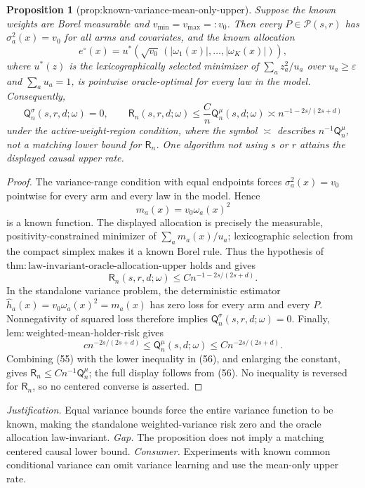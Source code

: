\documentclass{article}
\newtheorem{proposition}{Proposition}
\begin{document}
\begin{proposition}[prop:known-variance-mean-only-upper]\label{prop:known-variance-mean-only-upper}
Suppose the known weights are Borel measurable and \(v_{\min}=v_{\max}=:v_0\). Then every \(P\in\mathcal P(s,r)\) has \(\sigma_a^2(x)=v_0\) for all arms and covariates, and the known allocation
\[
e^{\circ}(x)
=u^*\!\left(\sqrt{v_0}\,(|\omega_1(x)|,\ldots,|\omega_K(x)|)\right),
\]
where \(u^*(z)\) is the lexicographically selected minimizer of \(\sum_a z_a^2/u_a\) over \(u_a\geq\varepsilon\) and \(\sum_a u_a=1\), is pointwise oracle-optimal for every law in the model. Consequently,
\[
\mathsf Q_n^{\sigma}(s,r,d;\omega)=0,
\qquad
\mathsf R_n(s,r,d;\omega)
\leq \frac{C}{n}\mathsf Q_n^{\mu}(s,d;\omega)
\asymp n^{-1-2s/(2s+d)}
\]
under the active-weight-region condition, where the symbol \(\asymp\) describes \(n^{-1}\mathsf Q_n^{\mu}\), not a matching lower bound for \(\mathsf R_n\). One algorithm not using \(s\) or \(r\) attains the displayed causal upper rate.
\end{proposition}
\begin{proof}
The variance-range condition with equal endpoints forces \(\sigma_a^2(x)=v_0\) pointwise for every arm and every law in the model. Hence
\[
m_a(x)=v_0\omega_a(x)^2
\]
is a known function. The displayed allocation is precisely the measurable, positivity-constrained minimizer of \(\sum_a m_a(x)/u_a\); lexicographic selection from the compact simplex makes it a known Borel rule. Thus the hypothesis of \(\mathrm{thm{:}law\text{-}invariant\text{-}oracle\text{-}allocation\text{-}upper}\) holds and gives
\[
\mathsf R_n(s,r,d;\omega)\leq C n^{-1-2s/(2s+d)}.
\tag{55}
\]
In the standalone variance problem, the deterministic estimator \(\widehat h_a(x)=v_0\omega_a(x)^2=m_a(x)\) has zero loss for every arm and every \(P\). Nonnegativity of squared loss therefore implies \(\mathsf Q_n^{\sigma}(s,r,d;\omega)=0\). Finally, \(\mathrm{lem{:}weighted\text{-}mean\text{-}holder\text{-}risk}\) gives
\[
c n^{-2s/(2s+d)}
\leq\mathsf Q_n^{\mu}(s,d;\omega)
\leq C n^{-2s/(2s+d)}.
\tag{56}
\]
Combining (55) with the lower inequality in (56), and enlarging the constant, gives \(\mathsf R_n\leq Cn^{-1}\mathsf Q_n^{\mu}\); the full display follows from (56). No inequality is reversed for \(\mathsf R_n\), so no centered converse is asserted.
\end{proof}
\par\smallskip\noindent \textit{Justification.} Equal variance bounds force the entire variance function to be known, making the standalone weighted-variance risk zero and the oracle allocation law-invariant. \textit{Gap.} The proposition does not imply a matching centered causal lower bound. \textit{Consumer.} Experiments with known common conditional variance can omit variance learning and use the mean-only upper rate.
\end{document}
